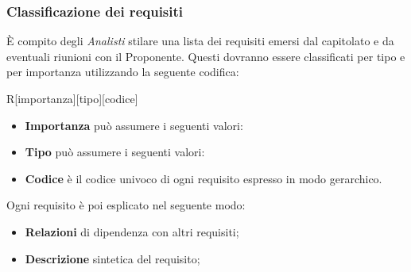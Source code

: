     \subsubsection{Classificazione dei requisiti}
      È compito degli \emph{Analisti} stilare una lista dei requisiti emersi dal capitolato e da eventuali riunioni con il Proponente. Questi dovranno essere
      classificati per tipo e per importanza utilizzando la seguente codifica:
      \begin{center}
        R[importanza][tipo][codice]
      \end{center}
      \begin{itemize}
        \item \textbf{Importanza} può assumere i seguenti valori:
          \bgroup
          \egroup
        \item \textbf{Tipo} può assumere i seguenti valori:
          \bgroup
          \egroup
        \item \textbf{Codice} è il codice univoco di ogni requisito espresso in modo gerarchico.
      \end{itemize}
      Ogni requisito è poi esplicato nel seguente modo:
      \begin{itemize}
        \item \textbf{Relazioni} di dipendenza con altri requisiti;
        \item \textbf{Descrizione} sintetica del requisito;
      \end{itemize}
